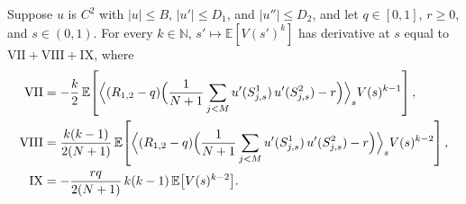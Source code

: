 \begin{lemma}\label{lem:sg-tal:perceptron-centered-moment-ode}
  \leanok
Suppose $u$ is $C^2$ with $|u|\le B$, $|u'|\le D_1$, and $|u''|\le D_2$, and let $q\in[0,1]$, $r\ge 0$,
and $s\in(0,1)$. For every $k\in\mathbb N$, $s'\mapsto\mathbb E[V(s')^k]$ has derivative at $s$ equal to
$\mathrm{VII}+\mathrm{VIII}+\mathrm{IX}$, where
\begin{align*}
 \mathrm{VII} &= -\frac{k}{2}\,\mathbb E\!\left[\Bigl\langle(R_{1,2}-q)\Bigl(\frac{1}{N+1}\sum_{j<M}u'(S^1_{j,s})\,u'(S^2_{j,s})-r\Bigr)\Bigr\rangle_s V(s)^{k-1}\right],\\
 \mathrm{VIII} &= \frac{k(k-1)}{2(N+1)}\,\mathbb E\!\left[\Bigl\langle(R_{1,2}-q)\Bigl(\frac{1}{N+1}\sum_{j<M}u'(S^1_{j,s})\,u'(S^2_{j,s})-r\Bigr)\Bigr\rangle_s V(s)^{k-2}\right],\\
 \mathrm{IX} &= -\frac{rq}{2(N+1)}\,k(k-1)\,\mathbb E\bigl[V(s)^{k-2}\bigr].
\end{align*}
\end{lemma}
